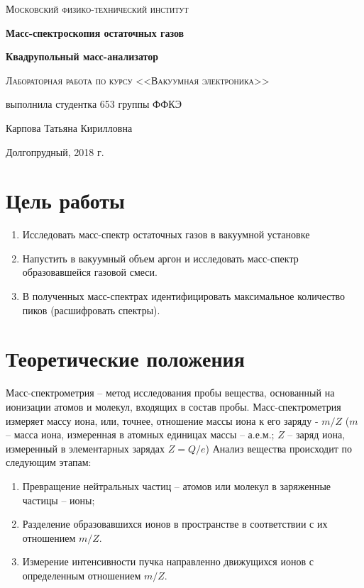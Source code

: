 \documentclass[a4paper]{article}
\begin{document}
\begin{titlepage}
	\centering
	\vspace{5cm}
	{\scshape\LARGE Московский физико-технический институт \par}
	\vspace{5cm}

	{\huge\bfseries Масс-спектроскопия остаточных газов \par}
	\vspace{0.5cm}
	{\huge\bfseries Квадрупольный масс-анализатор \par}
	\vspace{1cm}
	{\scshape\Large Лабораторная работа по курсу <<Вакуумная электроника>>\par}
	\vspace{1cm}
	\vfill
\begin{flushright}
	{\large выполнила студентка 653 группы ФФКЭ}\par
	\vspace{0.3cm}
	{\LARGE Карпова Татьяна Кирилловна} \par

	
\end{flushright}
	

	\vfill

	Долгопрудный, 2018 г.
\end{titlepage}

\section{Цель работы}
\begin{enumerate}
    \item Исследовать масс-спектр остаточных газов в вакуумной установке
\item Напустить в вакуумный объем аргон и исследовать масс-спектр образовавшейся газовой смеси.
\item В полученных масс-спектрах идентифицировать максимальное количество пиков
(расшифровать спектры).
\end{enumerate}

\section{Теоретические положения}

Масс-спектрометрия – метод исследования пробы вещества, основанный на ионизации атомов и молекул, входящих в состав пробы. Масс-спектрометрия измеряет массу иона, или, точнее, отношение массы иона к его
заряду - $m/Z$ ($m$ – масса иона, измеренная в атомных единицах массы – а.е.м.; $Z$ – заряд иона, измеренный в
элементарных зарядах $Z = Q/e $) Анализ вещества происходит по следующим этапам:
\begin{enumerate}
    \item Превращение нейтральных частиц – атомов или молекул в заряженные частицы – ионы;
    \item Разделение образовавшихся ионов в пространстве в соответствии с их отношением $m/Z$.
    \item Измерение интенсивности пучка направленно движущихся ионов с определенным отношением $m/Z$.
\end{enumerate}
\end{document}
